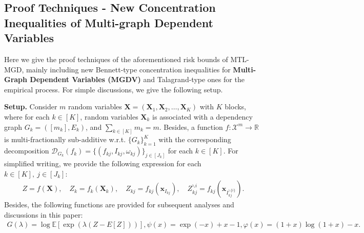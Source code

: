 \documentclass{article}
\def\sR{\mathbb{R}}
\def\vx{{\mathbf{x}}}
\def\mX{{\mathbf{X}}}
\def\eE{\mathbb{E}}
\begin{document}
\subsection{Proof Techniques - New Concentration Inequalities of Multi-graph Dependent Variables}
\label{sec-con:bennett-inequality}
Here we give the proof techniques of the aforementioned risk bounds of MTL-MGD, mainly including new Bennett-type concentration inequalities for \textbf{Multi-Graph Dependent Variables (MGDV)} and Talagrand-type ones for the empirical process. For simple discussions, we give the following setup.

\textbf{Setup.} Consider $m$ random variables $\mX = (\mX_1, \mX_2, \dots, \mX_K)$ with $K$ blocks, where for each $k \in [K]$, random variables $\mX_k$ is associated with a dependency graph \(G_k = ([m_k], E_k)\), and $\sum_{k \in [K]} m_k = m$. Besides, a function $f: \mathcal{X}^{m} \rightarrow \sR$ is multi-fractionally sub-additive w.r.t. $\{G_k\}_{k=1}^K$ with the corresponding decomposition $\mathcal{D}_{G_k}(f_k) = \{ (f_{kj}, I_{kj}, \omega_{kj}) \}_{j \in [J_k]}$ for each $k \in [K]$. 
For simplified writing, we provide the following expression for each $k \in [K], \ j \in [J_k]$: 
\begin{align} \label{def :Z def}
    Z = f(\mX), \quad Z_k = f_k(\mX_k),  \quad
    Z_{kj} = f_{kj} (\vx_{I_{kj}}),  \quad Z_{kj}^{\backslash{i}} = f_{kj} (\vx_{I_{kj}^{\backslash{\{i\}}}}). 
\end{align}
Besides, the following functions are provided for subsequent analyses and discussions in this paper:
\begin{align} \label{eq:psi_function}
     G(\lambda) = \log \eE [\exp(\lambda(Z - E[Z]))], 
    \psi(x) = \exp(-x) + x - 1, 
     \varphi(x) = (1 + x) \log(1 + x) - x. 
\end{align}
\end{document}
